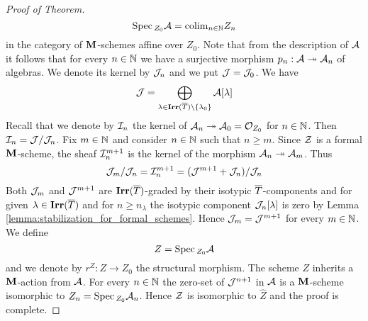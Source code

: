 \begin{proof}[Proof of Theorem]
$$\mathrm{Spec}\,_{Z_0}{\mathcal A} = \mathrm{colim}_{n\in {\mathbb N}}Z_n$$
in the category of $\mathbf{M}$-schemes affine over $Z_0$. Note that from the description of ${\mathcal A}$ it follows that for every $n\in {\mathbb N}$ we have a surjective morphism $p_n:{\mathcal A}\twoheadrightarrow {\mathcal A}_n$ of algebras. We denote its kernel by ${\mathcal J}_n$ and we put ${\mathcal J} = {\mathcal J}_0$. We have
$${\mathcal J}=\bigoplus_{\lambda \in \mathbf{Irr}(\overline{T})\setminus \{\lambda_0\}}{\mathcal A}[\lambda]$$
Recall that we denote by ${\mathcal I}_n$ the kernel of ${\mathcal A}_n\twoheadrightarrow {\mathcal A}_0={\mathcal O}_{Z_0}$ for $n\in {\mathbb N}$. Then ${\mathcal I}_n={\mathcal J}/{\mathcal J}_n$. Fix $m\in {\mathbb N}$ and consider $n\in {\mathbb N}$ such that $n\geq m$. Since ${\mathcal Z}$ is a formal $\mathbf{M}$-scheme, the sheaf ${\mathcal I}_n^{m+1}$ is the kernel of the morphism ${\mathcal A}_n\twoheadrightarrow {\mathcal A}_m$. Thus
$${\mathcal J}_m/{\mathcal J}_n={\mathcal I}_n^{m+1}=({\mathcal J}^{m+1}+{\mathcal J}_n)/{\mathcal J}_n$$
Both ${\mathcal J}_m$ and ${\mathcal J}^{m+1}$ are $\mathbf{Irr}(\overline{T})$-graded by their isotypic $\overline{T}$-components and for given $\lambda\in \mathbf{Irr}(\overline{T})$ and for $n \geq n_{\lambda}$ the isotypic component ${\mathcal J}_n[\lambda]$ is zero by Lemma \ref{lemma:stabilization_for_formal_schemes}. Hence ${\mathcal J}_m={\mathcal J}^{m+1}$ for every $m \in {\mathbb N}$.
We define
$$Z=\mathrm{Spec}\,_{Z_0}{\mathcal A}$$
and we denote by $r^Z:Z\to Z_0$ the structural morphism. The scheme $Z$ inherits a $\mathbf{M}$-action from ${\mathcal A}$. For every $n\in {\mathbb N}$ the zero-set of ${\mathcal J}^{n+1}$ in ${\mathcal A}$ is a $\mathbf{M}$-scheme isomorphic to $Z_n = \mathrm{Spec}\,_{Z_0}{\mathcal A}_n$. Hence ${\mathcal Z}$ is isomorphic to $\widehat{Z}$ and the proof is complete.
\end{proof}

